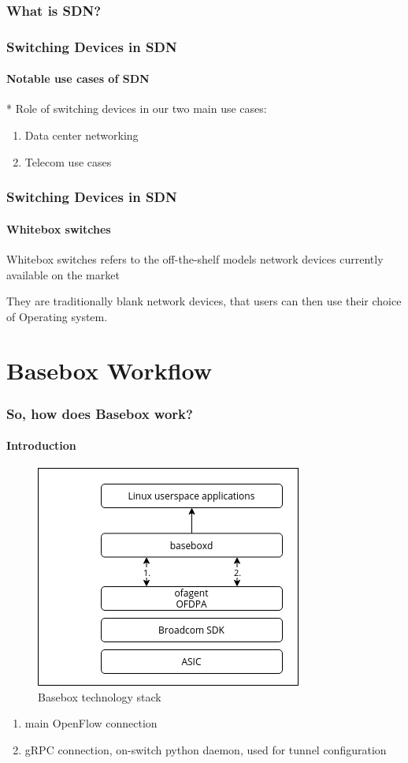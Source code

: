 \documentclass[11pt]{beamer}
\begin{document}
\begin{frame}
\frametitle{What is SDN?}


\end{frame}

\begin{frame}
\frametitle{Switching Devices in SDN}
\framesubtitle{Notable use cases of SDN}

* Role of switching devices in our two main use cases:
\begin{enumerate}
\item Data center networking
\item Telecom use cases
\end{enumerate}

\end{frame}

\begin{frame}
\frametitle{Switching Devices in SDN}
\framesubtitle{Whitebox switches}

Whitebox switches refers to the off-the-shelf models network devices currently available on the market

They are traditionally blank network devices, that users can then use their choice of Operating system.

\end{frame}

\section{Basebox Workflow}
\begin{frame}
\frametitle{So, how does Basebox work?}
\framesubtitle{Introduction}

\begin{figure}
\includegraphics[scale=0.4]{baseboxd_architecture.png}
\caption{Basebox technology stack}
\end{figure}

\begin{enumerate}
\item main OpenFlow connection
\item gRPC connection, on-switch python daemon, used for tunnel configuration
\end{enumerate}

\end{frame}
\end{document}
